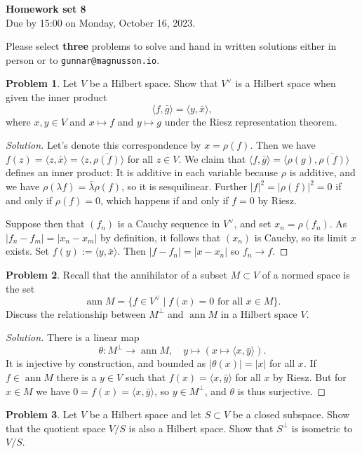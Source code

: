 \documentclass[11pt]{article}
\theoremstyle{definition}
\newtheorem{prob}{Problem}
\def\<{\langle}
\def\>{\rangle}
\DeclareMathOperator{\ann}{ann}
\def\head{
	\begin{center}
		\textbf{\LARGE Homework set 8}
		\\[3pt]
		Due by 15:00 on Monday, October 16, 2023.
	\end{center}
	\medskip
}
\begin{document}
\head

Please select \textbf{three} problems to solve and hand in written solutions
either in person or to \verb+gunnar@magnusson.io+.

\begin{prob}
	Let $V$ be a Hilbert space.
	Show that $V^\vee$ is a Hilbert space when given the inner product
	\[
		\< f, \bar g \> = \< y, \bar x \>,
	\]
	where $x, y \in V$ and $x \mapsto f$ and $y \mapsto g$ under the Riesz representation theorem.
\end{prob}

\begin{proof}[Solution]
	Let's denote this correspondence by $x = \rho(f)$.
	Then we have $f(z) = \< z, \bar x \> = \<z, \overline{\rho(f)}\>$ for all $z \in V$.
	We claim that $\<f, \bar g\> = \<\rho(g), \overline{\rho(f)}\>$ defines an inner product:
	It is additive in each variable because $\rho$ is additive, and we have $\rho(\lambda f) = \bar \lambda \rho(f)$, so it is sesquilinear.
	Further $|f|^2 = |\rho(f)|^2 = 0$ if and only if $\rho(f) = 0$, which happens if and only if $f = 0$ by Riesz.

	Suppose then that $(f_n)$ is a Cauchy sequence in $V^\vee$,
	and set $x_n = \rho(f_n)$.
	As $|f_n - f_m| = |x_n - x_m|$ by definition, it follows that $(x_n)$ is Cauchy, so its limit $x$ exists.
	Set $f(y) := \<y, \bar x\>$.
	Then $|f - f_n| = |x - x_n|$ so $f_n \to f$.
\end{proof}

\begin{prob}
	Recall that the annihilator of a subset $M \subset V$ of a normed space is the set
	\[
		\ann M = \{ f \in V^\vee \mid \text{$f(x) = 0$ for all $x \in M$}\}.
	\]
	Discuss the relationship between $M^\perp$ and $\ann M$ in a Hilbert space $V$.
\end{prob}

\begin{proof}[Solution]
	There is a linear map
	\[
		\theta : M^\perp \to \ann M,
		\quad
		y \mapsto (x \mapsto \<x, \bar y\>).
	\]
	It is injective by construction, and bounded as $|\theta(x)| = |x|$ for all $x$.
	If $f \in \ann M$ there is a $y \in V$ such that $f(x) = \<x, \bar y\>$ for all $x$ by Riesz.
	But for $x \in M$ we have $0 = f(x) = \<x, \bar y\>$, so $y \in M^\perp$, and $\theta$ is thus surjective.
\end{proof}

\begin{prob}
	Let $V$ be a Hilbert space and let $S \subset V$ be a closed subspace.
	Show that the quotient space $V/S$ is also a Hilbert space.
	Show that $S^\perp$ is isometric to $V / S$.
\end{prob}
\end{document}
